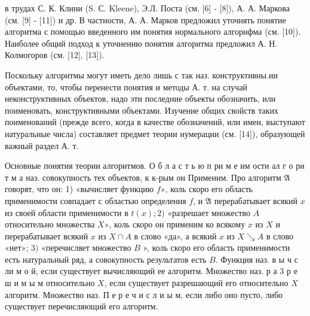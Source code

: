 \documentclass[10pt]{article}
\begin{document}
в трудах С. К. Клини (S. С. Kleene), Э.Л. Поста (см. [6] - [8]), А. А. Маркова (см. [9] - [11]) и др. В частности, А. А. Марков предложил уточнять понятие алгоритма с помощью введенного им понятия нормального алгорифма (см. [10]). Наиболее общий подход к уточнению понятия алгоритма предложил А. Н. Колмогоров (см. [12], [13]).



Поскольку алгоритмы могут иметь дело лишь с так наз. конструктивны.ии объектами, то, чтобы перенести понятия и методы А. т. на случай неконструктивных объектов, надо эти последние объекты обозначить, или поименовать, конструктивными объектами. Изучение общих свойств таких поименований (прежде всего, когда в качестве обозначений, или имен, выступают натуральные числа) составляет предмет теории нумерации (см. [14]), образующей важный раздел А. т.



Основные понятия теории алгоритмов. $О$ б л а с т ь ю п ри м е им ости ал г о ри т м а наз. совокупность тех объектов, к к-рым он Применим. Про алгоритм $\mathfrak{A}$ говорят, что он: 1) «вычисляет функцию $f »$, коль скоро его область применимости совпадает с областью определения $f$, и $\mathfrak{A}$ перерабатывает всякий $x$ из своей области применимости в $t(x) ; 2)$ «разрешает множество $A$ относительно множества $X »$, коль скоро он применим ко всякому $x$ из $X$ и перерабатывает всякий $x$ из $X \cap A$ в слово «да», а всякий $x$ из $X \searrow A$ в слово «нет»; 3$)$ «перечисляет множество $B$ », коль скоро его область применимости есть натуральный ряд, а совокупность результатов есть $B$. Функция наз. в ы ч с ли м о й, если существует вычисляющий ее алгоритм. Множество наз. р а 3 р е ш и м ы м относительно $X$, если существует разрешающий его относительно $X$ алгоритм. Множество наз. П е р е ч и с л и ы м, если либо оно пусто, либо существует перечисляющий его алгоритм.
\end{document}
